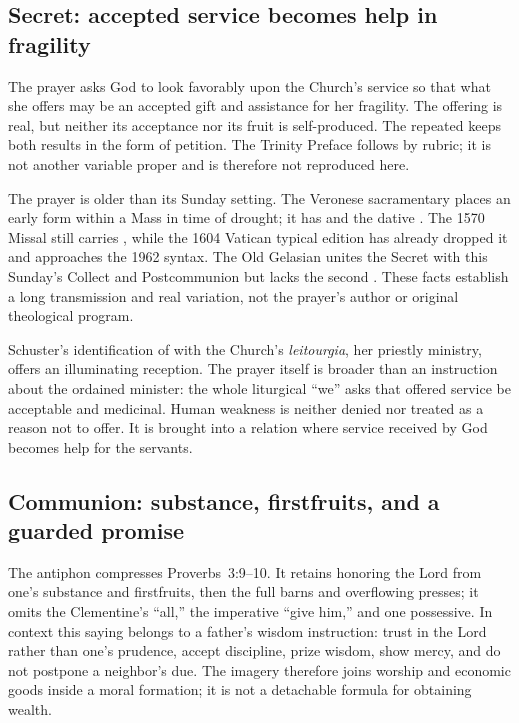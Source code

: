 \subsection*{Secret: accepted service becomes help in fragility\enspace{}}

The prayer asks God to look favorably upon the Church's service so that what
she offers may be an accepted gift and assistance for her fragility. The
offering is real, but neither its acceptance nor its fruit is self-produced.
The repeated  keeps both results in the form of petition. The
Trinity Preface follows by rubric; it is not another variable proper and is
therefore not reproduced here.

The prayer is older than its Sunday setting. The Veronese sacramentary places
an early form within a Mass in time of drought; it has
 and the dative
. The 1570 Missal still carries , while the 1604
Vatican typical edition has already dropped it and approaches the 1962
syntax. The Old Gelasian unites the Secret with this Sunday's Collect and
Postcommunion but lacks the second . These facts establish a long
transmission and real variation, not the prayer's author or original
theological program.

Schuster's identification of  with the Church's
\emph{leitourgia}, her priestly ministry, offers an illuminating reception.
The prayer itself is broader than an instruction about the ordained minister:
the whole liturgical ``we'' asks that offered service be acceptable and
medicinal. Human weakness is neither denied nor treated as a reason not to
offer. It is brought into a relation where service received by God becomes
help for the servants.

\subsection*{Communion: substance, firstfruits, and a guarded promise\enspace{}}

The antiphon compresses Proverbs~3:9--10. It retains honoring the Lord from
one's substance and firstfruits, then the full barns and overflowing presses;
it omits the Clementine's ``all,'' the imperative ``give him,'' and one
possessive. In context this saying belongs to a father's wisdom instruction:
trust in the Lord rather than one's prudence, accept discipline, prize wisdom,
show mercy, and do not postpone a neighbor's due. The imagery therefore joins
worship and economic goods inside a moral formation; it is not a detachable
formula for obtaining wealth.

